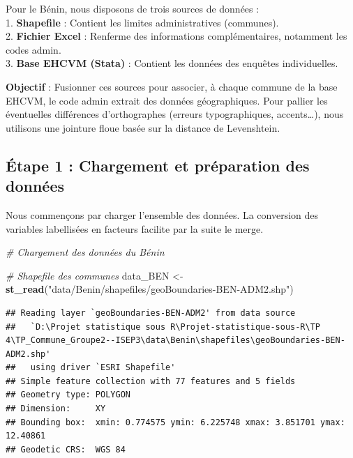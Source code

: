 \documentclass[
]{article}
\newenvironment{Shaded}{\begin{snugshade}}{\end{snugshade}}
\newcommand{\CommentTok}[1]{\textcolor[rgb]{0.56,0.35,0.01}{\textit{#1}}}
\newcommand{\FunctionTok}[1]{\textcolor[rgb]{0.13,0.29,0.53}{\textbf{#1}}}
\newcommand{\NormalTok}[1]{#1}
\newcommand{\OtherTok}[1]{\textcolor[rgb]{0.56,0.35,0.01}{#1}}
\newcommand{\StringTok}[1]{\textcolor[rgb]{0.31,0.60,0.02}{#1}}
\begin{document}
Pour le Bénin, nous disposons de trois sources de données :\\
1. \textbf{Shapefile} : Contient les limites administratives
(communes).\\
2. \textbf{Fichier Excel} : Renferme des informations complémentaires,
notamment les codes admin.\\
3. \textbf{Base EHCVM (Stata)} : Contient les données des enquêtes
individuelles.

\textbf{Objectif} : Fusionner ces sources pour associer, à chaque
commune de la base EHCVM, le code admin extrait des données
géographiques. Pour pallier les éventuelles différences d'orthographes
(erreurs typographiques, accents\ldots), nous utilisons une jointure
floue basée sur la distance de Levenshtein.

\hypertarget{uxe9tape-1-chargement-et-pruxe9paration-des-donnuxe9es}{%
\subsection{Étape 1 : Chargement et préparation des
données}\label{uxe9tape-1-chargement-et-pruxe9paration-des-donnuxe9es}}

Nous commençons par charger l'ensemble des données. La conversion des
variables labellisées en facteurs facilite par la suite le merge.

\begin{Shaded}
\begin{Highlighting}[]
\CommentTok{\# Chargement des données du Bénin}

\CommentTok{\# Shapefile des communes}
\NormalTok{data\_BEN }\OtherTok{\textless{}{-}} \FunctionTok{st\_read}\NormalTok{(}\StringTok{"data/Benin/shapefiles/geoBoundaries{-}BEN{-}ADM2.shp"}\NormalTok{)}
\end{Highlighting}
\end{Shaded}

\begin{verbatim}
## Reading layer `geoBoundaries-BEN-ADM2' from data source 
##   `D:\Projet statistique sous R\Projet-statistique-sous-R\TP 4\TP_Commune_Groupe2--ISEP3\data\Benin\shapefiles\geoBoundaries-BEN-ADM2.shp' 
##   using driver `ESRI Shapefile'
## Simple feature collection with 77 features and 5 fields
## Geometry type: POLYGON
## Dimension:     XY
## Bounding box:  xmin: 0.774575 ymin: 6.225748 xmax: 3.851701 ymax: 12.40861
## Geodetic CRS:  WGS 84
\end{verbatim}
\end{document}
